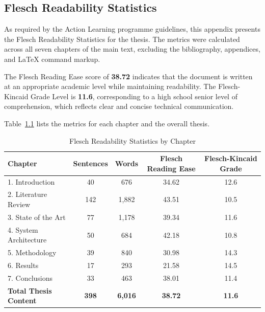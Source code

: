 \begin{appendices}
\chapter{Flesch Readability Statistics}
\label{app:readability-stats}

As required by the Action Learning programme guidelines, this appendix presents the Flesch Readability Statistics for the thesis. The metrics were calculated across all seven chapters of the main text, excluding the bibliography, appendices, and LaTeX command markup.

The Flesch Reading Ease score of \textbf{38.72} indicates that the document is written at an appropriate academic level while maintaining readability. The Flesch-Kincaid Grade Level is \textbf{11.6}, corresponding to a high school senior level of comprehension, which reflects clear and concise technical communication.

Table~\ref{tab:readability-stats} lists the metrics for each chapter and the overall thesis.

\begin{table}[htbp]
\centering
\caption{Flesch Readability Statistics by Chapter}
\label{tab:readability-stats}
\begin{tabular}{lcccc}
\toprule
\textbf{Chapter} & \textbf{Sentences} & \textbf{Words} & \textbf{Flesch Reading Ease} & \textbf{Flesch-Kincaid Grade} \\
\midrule
1. Introduction & 40 & 676 & 34.62 & 12.6 \\
2. Literature Review & 142 & 1,882 & 43.51 & 10.5 \\
3. State of the Art & 77 & 1,178 & 39.34 & 11.6 \\
4. System Architecture & 50 & 684 & 42.18 & 10.8 \\
5. Methodology & 39 & 840 & 30.98 & 14.3 \\
6. Results & 17 & 293 & 21.58 & 14.5 \\
7. Conclusions & 33 & 463 & 38.01 & 11.4 \\
\midrule
\textbf{Total Thesis Content} & \textbf{398} & \textbf{6,016} & \textbf{38.72} & \textbf{11.6} \\
\bottomrule
\end{tabular}
\end{table}

\cleardoublepage
{}
\listoffigures

\cleardoublepage
{}
\listoftables

\end{appendices}

